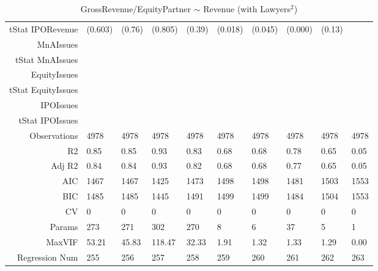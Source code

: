 \begin{table}[ht]
\begin{tabular}{rlllllllll}
  tStat IPORevenue & (0.603) & (0.76) & (0.805) & (0.39) & (0.018) & (0.045) & (0.000) & (0.13) &  \\ 
  MnAIssues &  &  &  &  &  &  &  &  &  \\ 
  tStat MnAIssues &  &  &  &  &  &  &  &  &  \\ 
  EquityIssues &  &  &  &  &  &  &  &  &  \\ 
  tStat EquityIssues &  &  &  &  &  &  &  &  &  \\ 
  IPOIssues &  &  &  &  &  &  &  &  &  \\ 
  tStat IPOIssues &  &  &  &  &  &  &  &  &  \\ 
  Observations & 4978 & 4978 & 4978 & 4978 & 4978 & 4978 & 4978 & 4978 & 4978 \\ 
  R2 & 0.85 & 0.85 & 0.93 & 0.83 & 0.68 & 0.68 & 0.78 & 0.65 & 0.05 \\ 
  Adj R2 & 0.84 & 0.84 & 0.93 & 0.82 & 0.68 & 0.68 & 0.77 & 0.65 & 0.05 \\ 
  AIC & 1467 & 1467 & 1425 & 1473 & 1498 & 1498 & 1481 & 1503 & 1553 \\ 
  BIC & 1485 & 1485 & 1445 & 1491 & 1499 & 1499 & 1484 & 1504 & 1553 \\ 
  CV & 0 & 0 & 0 & 0 & 0 & 0 & 0 & 0 & 0 \\ 
  Params & 273 & 271 & 302 & 270 & 8 & 6 & 37 & 5 & 1 \\ 
  MaxVIF & 53.21 & 45.83 & 118.47 & 32.33 & 1.91 & 1.32 & 1.33 & 1.29 & 0.00 \\ 
  Regression Num & 255 & 256 & 257 & 258 & 259 & 260 & 261 & 262 & 263 \\ 
   \hline
\end{tabular}
\caption{GrossRevenue/EquityPartner $\sim$ Revenue (with Lawyers$^2$)} 
\end{table}
